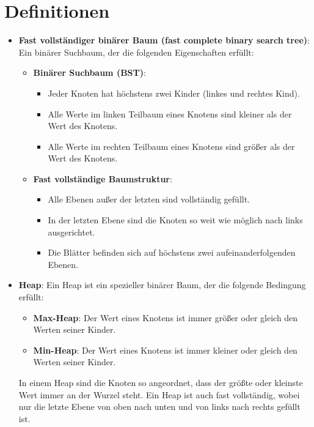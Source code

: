 \documentclass[a4paper,12pt]{article}
\begin{document}
\section{Definitionen}
\begin{itemize}
    \item \textbf{Fast vollständiger binärer Baum (fast complete binary search tree)}:  
    Ein binärer Suchbaum, der die folgenden Eigenschaften erfüllt:
    \begin{itemize}
        \item \textbf{Binärer Suchbaum (BST)}:
        \begin{itemize}
            \item Jeder Knoten hat höchstens zwei Kinder (linkes und rechtes Kind).
            \item Alle Werte im linken Teilbaum eines Knotens sind kleiner als der Wert des Knotens.
            \item Alle Werte im rechten Teilbaum eines Knotens sind größer als der Wert des Knotens.
        \end{itemize}
        \item \textbf{Fast vollständige Baumstruktur}:
        \begin{itemize}
            \item Alle Ebenen außer der letzten sind vollständig gefüllt.
            \item In der letzten Ebene sind die Knoten so weit wie möglich nach links ausgerichtet.
            \item Die Blätter befinden sich auf höchstens zwei aufeinanderfolgenden Ebenen.
        \end{itemize}
    \end{itemize}

    \item \textbf{Heap}:
    Ein Heap ist ein spezieller binärer Baum, der die folgende Bedingung erfüllt:
    \begin{itemize}
        \item \textbf{Max-Heap}: Der Wert eines Knotens ist immer größer oder gleich den Werten seiner Kinder.
        \item \textbf{Min-Heap}: Der Wert eines Knotens ist immer kleiner oder gleich den Werten seiner Kinder.
    \end{itemize}
    In einem Heap sind die Knoten so angeordnet, dass der größte oder kleinste Wert immer an der Wurzel steht. Ein Heap ist auch fast vollständig, wobei nur die letzte Ebene von oben nach unten und von links nach rechts gefüllt ist.
    

\end{itemize}
\end{document}
